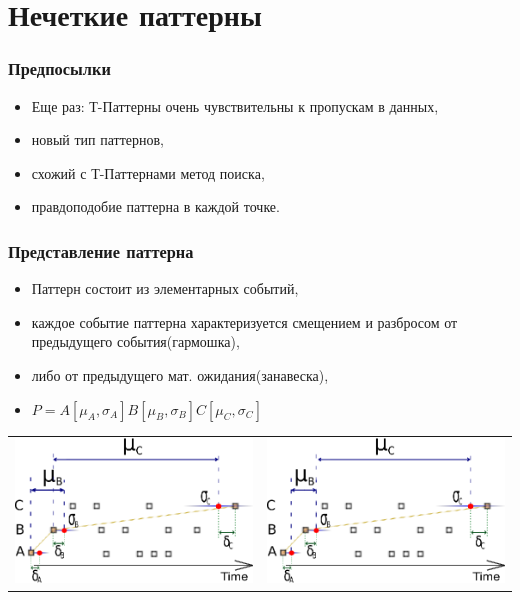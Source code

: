 \documentclass[smaller]{beamer}
\begin{document}
\section{Нечеткие паттерны}
\begin{frame}
  \frametitle{Предпосылки}
  \begin{itemize}
  \item Еще раз: Т-Паттерны очень чувствительны к пропускам в данных,
  \item новый тип паттернов, 
  \item схожий с Т-Паттернами метод поиска,
  \item правдоподобие паттерна в каждой точке.
   \end{itemize}
\end{frame}

\begin{frame}
\frametitle{Представление паттерна}
 \begin{itemize}
  \item Паттерн состоит из элементарных событий,
  \item каждое событие паттерна характеризуется смещением и разбросом от предыдущего события(гармошка),
  \item либо от предыдущего мат. ожидания(занавеска),
  \item $P=A[\mu_A,\sigma_A]B[\mu_B,\sigma_B]C[\mu_C,\sigma_C]$
 \end{itemize}
\begin{left}
\begin{tabular}[t]{p{12em}|p{12em}}
    \includegraphics[scale=0.6]{il1.eps} & \includegraphics[scale=0.6]{il2.eps}\\


\end{tabular}
\end{left}
\end{frame}
\end{document}
